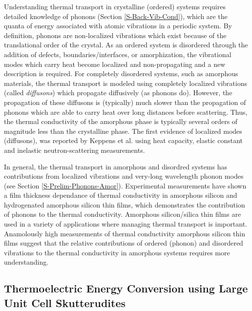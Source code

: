\documentclass[letterpaper,12pt]{article}
\begin{document}
Understanding thermal transport in crystalline (ordered) systems requires detailed knowledge of phonons (Section \ref{S-Back-Vib-Cond}), which are the quanta of energy associated with atomic vibrations in a periodic system.\cite{dove1993,ashcroft1976,srivastava1990,wallace1972} By definition, phonons are non-localized vibrations which exist because of the translational order of the crystal. As an ordered system is disordered through the addition of defects, boundaries/interfaces, or amorphization, the vibrational modes which carry heat become localized and non-propagating and a new description is required. For completely disordered systems, such as amorphous materials, the thermal transport is modeled using completely localized vibrations (called \emph{diffusons}) which propagate diffusively (as phonons do).\cite{allen1993} However, the propagation of these diffusons is (typically) much slower than the propagation of phonons which are able to carry heat over long distances before scattering. Thus, the thermal conductivity of the amorphous phase is typically several orders of magnitude less than the crystalline phase.\cite{freeman1986,cahill1992} The first evidence of localized modes (diffusons), was reported by Keppens et al. using heat
capacity, elastic constant and inelastic neutron-scattering
measurements.\cite{keppens1998} 

In general, the thermal transport in amorphous and disordred systems has contributions from localized vibrations and very-long wavelength phonon modes (see Section \ref{S-Prelim-Phonons-Amor}).  Experimental measurements have shown a film thickness dependance of thermal conductivity in amorphous silicon \cite{Moon_2002} and hydrogenated amorphous silicon thin films\cite{PhysRevLett.102.035901}, which demonstrates the contribution of phonons to the thermal conductivity. Amorphous silicon/silica thin films are used in a variety of applications where managing thermal transport is important. Anamolously high measurements of thermal conductivity amorphous silicon thin films\cite{PhysRevB.81.104203} suggest that the relative contributions of ordered (phonon) and disordered vibrations to the thermal conductivity in amorphous systems requires more understanding.\cite{Zink_Pietri_Hellman_2006}

\subsection{\label{S-Motivation-Skutterudites}Thermoelectric Energy Conversion using Large Unit Cell Skutterudites}
\end{document}

